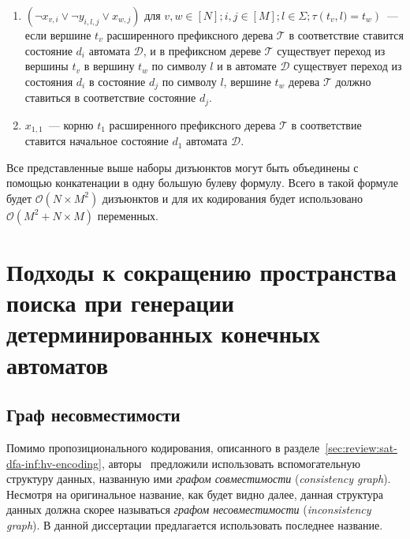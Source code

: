 \begin{enumerate}
  \item $\left(\neg x_{v,i} \vee \neg y_{i,l,j} \vee x_{w,j}\right)$ для $v,w \in \left[N\right]; i,j \in \left[M\right];l \in \Sigma; \tau\left(t_{v},l) = t_{w}\right)$~{---} если вершине $t_{v}$ расширенного префиксного дерева $\mathcal{T} $ в соответствие ставится состояние $d_{i}$ автомата $\mathcal{D}$, и в префиксном дереве $\mathcal{T}$ существует переход из вершины $t_{v}$ в вершину $t_{w}$ по символу $l$ и в автомате $\mathcal{D}$ существует переход из состояния $d_{i}$ в состояние $d_{j}$ по символу $l$, вершине $t_{w}$ дерева $\mathcal{T}$ должно ставиться в соответствие состояние $d_{j}$.
  \item $x_{1,1}$~{---} корню $t_{1}$ расширенного префиксного дерева $\mathcal{T} $ в соответствие ставится начальное состояние $d_{1}$ автомата $\mathcal{D}$.
\end{enumerate}

Все представленные выше наборы дизъюнктов могут быть объединены с помощью конкатенации в одну большую булеву формулу. Всего в такой формуле будет $\mathcal{O}(N \times M^{2})$ дизъюнктов и для их кодирования будет использовано $\mathcal{O}(M^2 + N \times M)$ переменных.


\section{Подходы к сокращению пространства поиска при генерации детерминированных конечных автоматов}
\label{sec:review:sym-breaking}


\subsection{Граф несовместимости}
\label{sec:review:sym-breaking:ig}

Помимо пропозиционального кодирования, описанного в разделе~\ref{sec:review:sat-dfa-inf:hv-encoding}, авторы~\cite{heule-icgi10} предложили использовать вспомогательную структуру данных, названную ими \emph{графом совместимости} (\emph{consistency graph}).
Несмотря на оригинальное название, как будет видно далее, данная структура данных должна скорее называться \emph{графом несовместимости} (\emph{inconsistency graph}).
В данной диссертации предлагается использовать последнее название.

